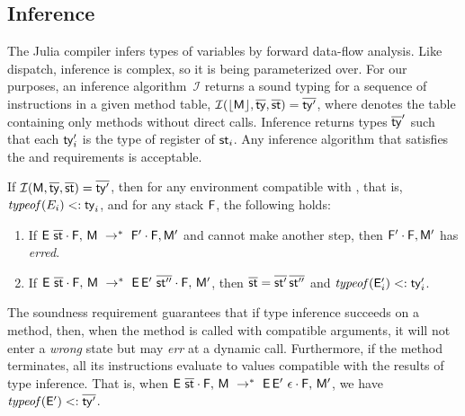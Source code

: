 \subsection{Inference}\label{sec:infer}

The Julia compiler infers types of variables by forward data-flow analysis. Like
dispatch, inference is complex, so it is being parameterized over. For our purposes, an
inference algorithm~$\mathcal I$ returns a sound typing for a sequence of
instructions in a given method table,
$\operatorname{\mathcal{I}}(\lfloor \mathsf{M} \rfloor, \overline{\mathsf{ty}}, \overline{\mathsf{st}})=\overline{\mathsf{ty}'}$, where \origmtbl{\mtbl}
denotes the table containing only methods without direct calls. Inference
returns types $\overline{\mathsf{ty}}'$ such that each $\mathsf{ty}'_i$ is the type of register of
$\mathsf{st}_i$. Any inference algorithm that satisfies the  and
 requirements is acceptable.

\begin{requirement}[Soundness] If
  $\operatorname{\mathcal{I}}(\mathsf{M}, \overline{\mathsf{ty}}, \overline{\mathsf{st}}) = \overline{\mathsf{ty}'}$, then
  for any environment \env compatible with \ol\ty, that is, $\operatorname{\mathit{typeof}}(E_{i}) <: \mathsf{ty}_{i}$,
  and for any stack $\mathsf{F}$, the following holds:
%
  \begin{enumerate}
  \item If
  $\config{\stk{\env\ \ol\st}\frm}{\mtbl} \stepmul \stk{\frm'}{\frm},\mtbl'$
  and %
  cannot make another step,
  then $\mathsf{F}' \cdot \mathsf{F},\mathsf{M}'$ has \emph{erred}.
  \item If $\config{\stk{\env\ \ol\st}{\frm}}{\mtbl} \stepmul
    \config{\stk{\env\,\env'\ \ol{\st''}}{\frm}}{\mtbl'}$,
  then $\overline{\mathsf{st}} = \overline{\mathsf{st}'}\,\overline{\mathsf{st}''}$ and $\operatorname{\mathit{typeof}}(\mathsf{E}'_{i}) <: \mathsf{ty}'_{i}$.
  \end{enumerate}
 \end{requirement}

The soundness requirement guarantees that if type inference succeeds on a method,
then, when the method is called with compatible arguments,
it will not enter a \emph{wrong} state but may \emph{err} at a dynamic call.
Furthermore, if the method terminates, all its instructions evaluate
to values compatible with the results of type inference.
That is, when $\config{\stk{\env\ \ol\st}{\frm}}{\mtbl} \stepmul
\config{\stk{\env\,\env'\ \done}{\frm}}{\mtbl'}$, we have
$\operatorname{\mathit{typeof}}(\mathsf{E}') <: \overline{\mathsf{ty}'}$.

